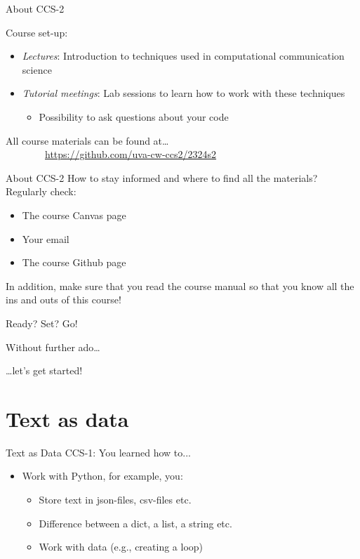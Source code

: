\documentclass[handout]{beamer}
\begin{document}
\begin{frame}{About CCS-2} 
	
Course set-up:
\begin{itemize}[<+->]
	\item \emph{Lectures}: Introduction to techniques used in computational communication science
	\item \emph{Tutorial meetings}: Lab sessions to learn how to work with these techniques
	\begin{itemize}
		\item Possibility to ask questions about your code
	\end{itemize}
\end{itemize}

\end{frame}

\begin{frame} 
	All course materials can be found at\ldots \\
	~~~~~~~~\url{https://github.com/uva-cw-ccs2/2324s2}
\end{frame}

\begin{frame}{About CCS-2} 
How to stay informed and where to find all the materials? Regularly check:	
	\begin{itemize}
		\item The course Canvas page
		\item Your email
		\item The course Github page
	\end{itemize}
In addition, make sure that you read the course manual so that you know all the ins and outs of this course!
\end{frame}


\begin{frame}{Ready? Set? Go!} 
	
	Without further ado\dots
	
	\dots let's get started!
	
\end{frame}

\section{Text as data}

\begin{frame}{Text as Data}
	CCS-1: You learned how to...
		\begin{itemize}
		\item Work with Python, for example, you:
		\begin{itemize}
			\item Store text in json-files, csv-files etc.
			\item Difference between a dict, a list, a string etc.
			\item Work with data (e.g., creating a loop)
		\end{itemize}
	\end{itemize}
	\end{frame}
\end{document}
